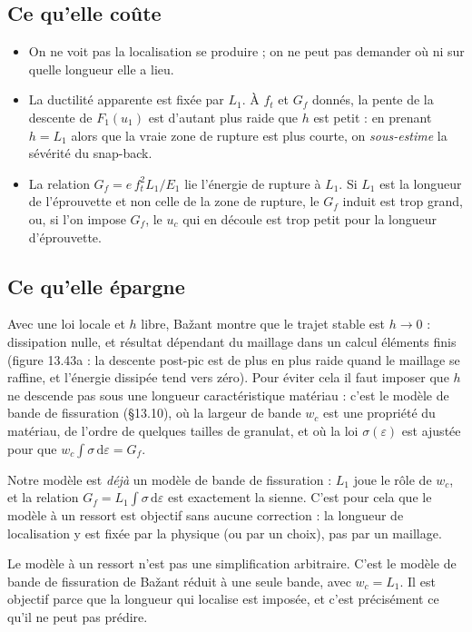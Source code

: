 \documentclass[11pt,a4paper]{article}
\newcommand{\dd}{\mathrm{d}}
\newcommand{\uc}{u_c}
\begin{document}
\subsection{Ce qu'elle coûte}
\begin{itemize}[nosep]
  \item On ne voit pas la localisation se produire ; on ne peut pas demander où ni sur quelle
        longueur elle a lieu.
  \item La ductilité apparente est fixée par $L_1$. À $f_t$ et $G_f$ donnés, la pente de la
        descente de $F_1(u_1)$ est d'autant plus raide que $h$ est petit : en prenant $h = L_1$
        alors que la vraie zone de rupture est plus courte, on \emph{sous-estime} la sévérité du
        snap-back.
  \item La relation $G_f = e\,f_t^2L_1/E_1$ lie l'énergie de rupture à $L_1$. Si $L_1$ est la
        longueur de l'éprouvette et non celle de la zone de rupture, le $G_f$ induit est trop
        grand, ou, si l'on impose $G_f$, le $\uc$ qui en découle est trop petit pour la longueur
        d'éprouvette.
\end{itemize}

\subsection{Ce qu'elle épargne}
Avec une loi locale et $h$ libre, Bažant montre que le trajet stable est $h \to 0$ : dissipation
nulle, et résultat dépendant du maillage dans un calcul éléments finis (figure 13.43a : la
descente post-pic est de plus en plus raide quand le maillage se raffine, et l'énergie dissipée
tend vers zéro). Pour éviter cela il faut imposer que $h$ ne descende pas sous une longueur
caractéristique matériau : c'est le modèle de bande de fissuration (§13.10), où la largeur de
bande $w_c$ est une propriété du matériau, de l'ordre de quelques tailles de granulat, et où la
loi $\sigma(\varepsilon)$ est ajustée pour que $w_c\int\sigma\,\dd\varepsilon = G_f$.

Notre modèle est \emph{déjà} un modèle de bande de fissuration : $L_1$ joue le rôle de $w_c$, et
la relation $G_f = L_1\int\sigma\,\dd\varepsilon$ est exactement la sienne. C'est pour cela que le
modèle à un ressort est objectif sans aucune correction : la longueur de localisation y est
fixée par la physique (ou par un choix), pas par un maillage.

\begin{idee}
Le modèle à un ressort n'est pas une simplification arbitraire. C'est le modèle de bande de
fissuration de Bažant réduit à une seule bande, avec $w_c = L_1$. Il est objectif parce que
la longueur qui localise est imposée, et c'est précisément ce qu'il ne peut pas prédire.
\end{idee}
\end{document}
